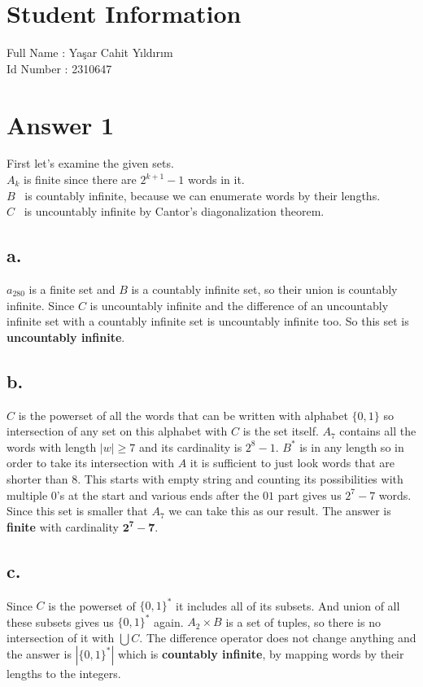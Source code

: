 \documentclass[12pt]{article}
\begin{document}
\section*{Student Information} 
Full Name :  Yaşar Cahit Yıldırım\\
Id Number :  2310647\\

\section*{Answer 1}
\qquad First let's examine the given sets.\\
$A_k$ is finite since there are $2^{k+1}-1$ words in it.\\
$B$ \ is countably infinite, because we can enumerate words by their lengths.\\
$C$ \ is uncountably infinite by Cantor's diagonalization theorem.

\subsection*{a.}
\qquad $a_{280}$ is a finite set and $B$ is a countably infinite set, so their union is countably infinite. Since $C$ is uncountably infinite and the difference of an uncountably infinite set with a countably infinite set is uncountably infinite too. So this set is \textbf{uncountably infinite}.
\subsection*{b.}
\qquad $C$ is the powerset of all the words that can be written with alphabet $\{0, 1\}$ so intersection of any set on this alphabet with $C$ is the set itself. $A_7$ contains all the words with length $|w|\geq7$ and its cardinality is $2^8-1$. $B^*$ is in any length so in order to take its intersection with $A$ it is sufficient to just look words that are shorter than $8$. This starts with empty string and counting its possibilities with multiple $0$'s at the start and various ends after the $01$ part gives us $2^7-7$ words. Since this set is smaller that $A_7$ we can take this as our result. The answer is \textbf{finite} with cardinality $\boldsymbol{2^7-7}$.
\subsection*{c.}
\qquad Since $C$ is the powerset of $\{0, 1\}^*$ it includes all of its subsets. And union of all these subsets gives us $\{0, 1\}^*$ again. $A_2 \times B$ is a set of tuples, so there is no intersection of it with $\bigcup C$. The difference operator does not change anything and the answer is $|\{0, 1\}^*|$ which is \textbf{countably infinite}, by mapping words by their lengths to the integers.
\end{document}
